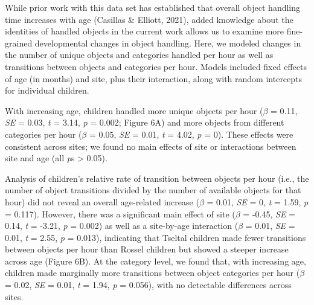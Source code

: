 \documentclass[10pt, letterpaper]{article}
\begin{document}
While prior work with this data set has established that overall object
handling time increases with age (Casillas \& Elliott, 2021), added
knowledge about the identities of handled objects in the current work
allows us to examine more fine-grained developmental changes in object
handling. Here, we modeled changes in the number of unique objects and
categories handled per hour as well as transitions between objects and
categories per hour. Models included fixed effects of age (in months)
and site, plus their interaction, along with random intercepts for
individual children.

With increasing age, children handled more unique objects per hour
(\(\beta\) = 0.11, \emph{SE} = 0.03, \emph{t} = 3.14, \emph{p} = 0.002;
Figure 6A) and more objects from different categories per hour
(\(\beta\) = 0.05, \emph{SE} = 0.01, \emph{t} = 4.02, \emph{p} = 0).
These effects were consistent across sites; we found no main effects of
site or interactions between site and age (all \emph{p}s \textgreater{}
0.05).

Analysis of children's relative rate of transition between objects per
hour (i.e., the number of object transitions divided by the number of
available objects for that hour) did not reveal an overall age-related
increase (\(\beta\) = 0.01, \emph{SE} = 0, \emph{t} = 1.59, \emph{p} =
0.117). However, there was a significant main effect of site (\(\beta\)
= -0.45, \emph{SE} = 0.14, \emph{t} = -3.21, \emph{p} = 0.002) as well
as a site-by-age interaction (\(\beta\) = 0.01, \emph{SE} = 0.01,
\emph{t} = 2.55, \emph{p} = 0.013), indicating that Tseltal children
made fewer transitions between objects per hour than Rossel children but
showed a steeper increase across age (Figure 6B). At the category level,
we found that, with increasing age, children made marginally more
transitions between object categories per hour (\(\beta\) = 0.02,
\emph{SE} = 0.01, \emph{t} = 1.94, \emph{p} = 0.056), with no detectable
differences across sites.
\end{document}
